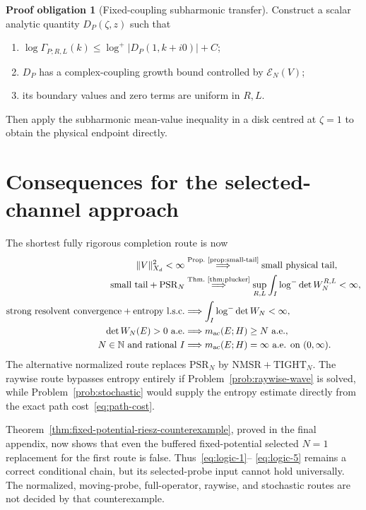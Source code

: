 \documentclass[11pt]{article}
\newcommand{\N}{\mathbb N}
\newcommand{\cE}{\mathcal E}
\newcommand{\ac}{\mathrm{ac}}
\theoremstyle{definition}
\newtheorem{problem}[theorem]{Proof obligation}
\theoremstyle{remark}
\begin{document}
\begin{problem}[Fixed-coupling subharmonic transfer]\label{prob:subharmonic}
Construct a scalar analytic quantity $D_{P}(\zeta,z)$ such that
\begin{enumerate}[label=(\roman*)]
 \item $\log\Gamma_{P;R,L}(k)\leq\log^+|D_P(1,k+i0)|+C$;
 \item $D_P$ has a complex-coupling growth bound controlled by $\cE_N(V)$;
 \item its boundary values and zero terms are uniform in $R,L$.
\end{enumerate}
Then apply the subharmonic mean-value inequality in a disk centred at $\zeta=1$ to obtain the physical endpoint directly.
\end{problem}

\section{Consequences for the selected-channel approach}

The shortest fully rigorous completion route is now
\begin{align}
 \|V\|_{X_d}^2<\infty
 &\overset{\text{Prop.~\ref{prop:small-tail}}}{\Longrightarrow}
 \text{small physical tail},
 \label{eq:logic-1}\\
 \text{small tail}+\mathrm{PSR}_N
 &\overset{\text{Thm.~\ref{thm:plucker}}}{\Longrightarrow}
 \sup_{R,L}\int_I\log^-\det W_N^{R,L}<\infty,
 \label{eq:logic-2}\\
 \text{strong resolvent convergence}+\text{entropy l.s.c.}
 &\Longrightarrow
 \int_I\log^-\det W_N<\infty,
 \label{eq:logic-3}\\
 \det W_N(E)>0\ \text{a.e.}
 &\Longrightarrow m_{\ac}(E;H)\geq N\ \text{a.e.},
 \label{eq:logic-4}\\
 N\in\N\ \text{and rational }I
 &\Longrightarrow m_{\ac}(E;H)=\infty\ \text{a.e. on }(0,\infty).
 \label{eq:logic-5}
\end{align}
The alternative normalized route replaces $\mathrm{PSR}_N$ by $\mathrm{NMSR}+\mathrm{TIGHT}_N$.  The raywise route bypasses entropy entirely if Problem~\ref{prob:raywise-wave} is solved, while Problem~\ref{prob:stochastic} would supply the entropy estimate directly from the exact path cost~\eqref{eq:path-cost}.

Theorem~\ref{thm:fixed-potential-riesz-counterexample}, proved in the final
appendix, now shows that even the buffered fixed-potential selected $N=1$
replacement for the first route is false.  Thus~\eqref{eq:logic-1}--
\eqref{eq:logic-5} remains a correct conditional chain, but its selected-probe
input cannot hold universally.  The normalized, moving-probe, full-operator,
raywise, and stochastic routes are not decided by that counterexample.
\end{document}
